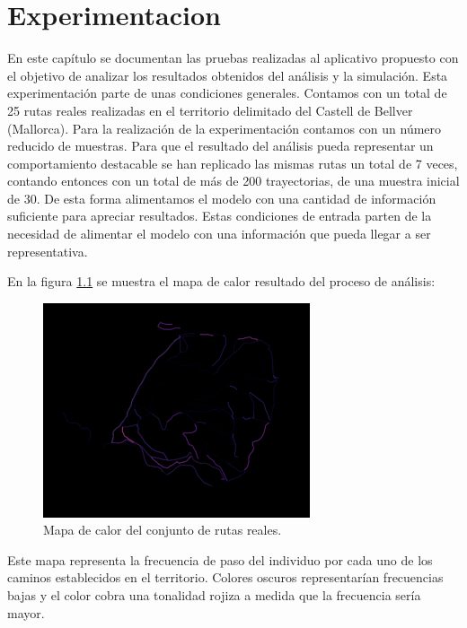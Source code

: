 \chapter{Experimentacion} \label{chapter:Experimentation}
En este capítulo se documentan las pruebas realizadas al aplicativo propuesto con el objetivo de analizar los resultados obtenidos del análisis y la simulación.
Esta experimentación parte de unas condiciones generales. Contamos con un total de 25 rutas reales realizadas en el territorio delimitado del Castell de Bellver (Mallorca). Para la realización de la experimentación contamos con un número reducido de muestras. Para que el resultado del análisis pueda representar un comportamiento destacable se han replicado las mismas rutas un total de 7 veces, contando entonces con un total de más de 200 trayectorias, de una muestra inicial de 30. De esta forma alimentamos el modelo con una cantidad de información suficiente para apreciar resultados. Estas condiciones de entrada parten de la necesidad de alimentar el modelo con una información que pueda llegar a ser representativa.

En la figura \ref{figure:RealHeatMap} se muestra el mapa de calor resultado del proceso de análisis:
\begin{figure}[!htb]
\begin{center}
\includegraphics[width=0.7\textwidth]{./Imagenes/HeatMap.png}
\caption{Mapa de calor del conjunto de rutas reales.}
\label{figure:RealHeatMap}
\end{center}
\end{figure}
\newpage
Este mapa representa la frecuencia de paso del individuo por cada uno de los caminos establecidos en 
el territorio. Colores oscuros representarían frecuencias bajas y el color cobra una tonalidad rojiza a 
medida que la frecuencia sería mayor.

